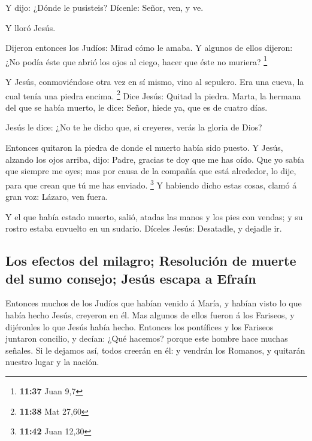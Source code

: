  Y dijo: ¿Dónde le pusisteis? Dícenle: Señor, ven, y ve.

 Y lloró Jesús.

 Dijeron entonces los Judíos: Mirad cómo le amaba.
 Y algunos de ellos dijeron: ¿No podía éste que abrió los
ojos al ciego, hacer que éste no muriera? \footnote{\textbf{11:37} Juan
  9,7}

 Y Jesús, conmoviéndose otra vez en sí mismo, vino al
sepulcro. Era una cueva, la cual tenía una piedra encima. \footnote{\textbf{11:38}
  Mat 27,60}  Dice Jesús: Quitad la piedra. Marta, la
hermana del que se había muerto, le dice: Señor, hiede ya, que es de
cuatro días.

 Jesús le dice: ¿No te he dicho que, si creyeres, verás la
gloria de Dios?

 Entonces quitaron la piedra de donde el muerto había sido
puesto. Y Jesús, alzando los ojos arriba, dijo: Padre, gracias te doy
que me has oído.  Que yo sabía que siempre me oyes; mas por
causa de la compañía que está alrededor, lo dije, para que crean que tú
me has enviado. \footnote{\textbf{11:42} Juan 12,30}  Y
habiendo dicho estas cosas, clamó á gran voz: Lázaro, ven fuera.

 Y el que había estado muerto, salió, atadas las manos y
los pies con vendas; y su rostro estaba envuelto en un sudario. Díceles
Jesús: Desatadle, y dejadle ir.

\hypertarget{los-efectos-del-milagro-resoluciuxf3n-de-muerte-del-sumo-consejo-jesuxfas-escapa-a-efrauxedn}{%
\subsection{Los efectos del milagro; Resolución de muerte del sumo
consejo; Jesús escapa a
Efraín}\label{los-efectos-del-milagro-resoluciuxf3n-de-muerte-del-sumo-consejo-jesuxfas-escapa-a-efrauxedn}}

 Entonces muchos de los Judíos que habían venido á María, y
habían visto lo que había hecho Jesús, creyeron en él.  Mas
algunos de ellos fueron á los Fariseos, y dijéronles lo que Jesús había
hecho.  Entonces los pontífices y los Fariseos juntaron
concilio, y decían: ¿Qué hacemos? porque este hombre hace muchas
señales.  Si le dejamos así, todos creerán en él: y vendrán
los Romanos, y quitarán nuestro lugar y la nación.

